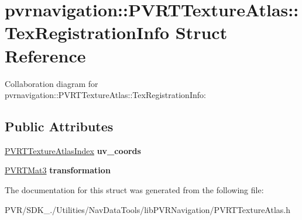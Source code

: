 \hypertarget{structpvrnavigation_1_1_p_v_r_t_texture_atlas_1_1_tex_registration_info}{\section{pvrnavigation\+:\+:P\+V\+R\+T\+Texture\+Atlas\+:\+:Tex\+Registration\+Info Struct Reference}
\label{structpvrnavigation_1_1_p_v_r_t_texture_atlas_1_1_tex_registration_info}
}


Collaboration diagram for pvrnavigation\+:\+:P\+V\+R\+T\+Texture\+Atlas\+:\+:Tex\+Registration\+Info\+:
\subsection*{Public Attributes}
\begin{DoxyCompactItemize}
\item 
\hypertarget{structpvrnavigation_1_1_p_v_r_t_texture_atlas_1_1_tex_registration_info_ade1f26060686b8efe9026866121a3fda}{\hyperlink{structpvrnavigation_1_1_p_v_r_t_texture_atlas_index}{P\+V\+R\+T\+Texture\+Atlas\+Index} {\bfseries uv\+\_\+coords}}\label{structpvrnavigation_1_1_p_v_r_t_texture_atlas_1_1_tex_registration_info_ade1f26060686b8efe9026866121a3fda}

\item 
\hypertarget{structpvrnavigation_1_1_p_v_r_t_texture_atlas_1_1_tex_registration_info_ad9e10f49ffd3cce897bfbf02ae0c28a9}{\hyperlink{struct_p_v_r_t_mat3}{P\+V\+R\+T\+Mat3} {\bfseries transformation}}\label{structpvrnavigation_1_1_p_v_r_t_texture_atlas_1_1_tex_registration_info_ad9e10f49ffd3cce897bfbf02ae0c28a9}

\end{DoxyCompactItemize}


The documentation for this struct was generated from the following file\+:\begin{DoxyCompactItemize}
\item 
P\+V\+R/\+S\+D\+K\+\_./\+Utilities/\+Nav\+Data\+Tools/lib\+P\+V\+R\+Navigation/P\+V\+R\+T\+Texture\+Atlas.\+h\end{DoxyCompactItemize}
